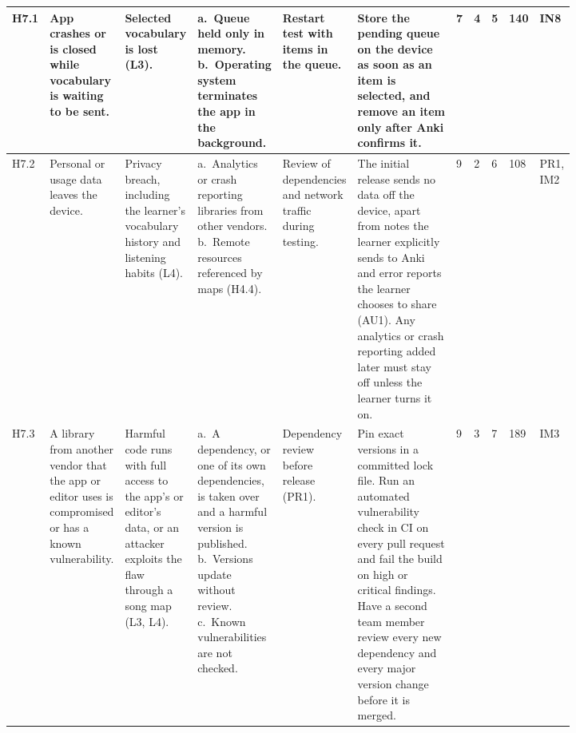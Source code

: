 \documentclass{article}
\begin{document}
\begin{landscape}
\begin{longtable}{P{0.04\linewidth}P{0.10\linewidth}P{0.12\linewidth}P{0.11\linewidth}P{0.10\linewidth}P{0.19\linewidth}P{0.022\linewidth}P{0.022\linewidth}P{0.022\linewidth}P{0.03\linewidth}P{0.06\linewidth}}
\midrule
H7.1 & App crashes or is closed while vocabulary is waiting to be sent. &
Selected vocabulary is lost (L3). &
a.~Queue held only in memory.\newline
b.~Operating system terminates the app in the background. &
Restart test with items in the queue. &
Store the pending queue on the device as soon as an item is selected, and
remove an item only after Anki confirms it. &
7 & 4 & 5 & 140 & IN8\\
\midrule
H7.2 & Personal or usage data leaves the device. &
Privacy breach, including the learner's vocabulary history and listening
habits (L4). &
a.~Analytics or crash reporting libraries from other vendors.\newline
b.~Remote resources referenced by maps (H4.4). &
Review of dependencies and network traffic during testing. &
The initial release sends no data off the device, apart from notes the learner
explicitly sends to Anki and error reports the learner chooses to share (AU1).
Any analytics or crash reporting added later must stay off unless the learner
turns it on. &
9 & 2 & 6 & 108 & PR1, IM2\\
\midrule
H7.3 & A library from another vendor that the app or editor uses is
compromised or has a known vulnerability. &
Harmful code runs with full access to the app's or editor's data, or an
attacker exploits the flaw through a song map (L3, L4). &
a.~A dependency, or one of its own dependencies, is taken over and a harmful
version is published.\newline
b.~Versions update without review.\newline
c.~Known vulnerabilities are not checked. &
Dependency review before release (PR1). &
Pin exact versions in a committed lock file. Run an automated vulnerability
check in CI on every pull request and fail the build on high or critical
findings. Have a second team member review every new dependency and every
major version change before it is merged. &
9 & 3 & 7 & 189 & IM3\\
\end{longtable}
\end{landscape}
\ClearShipoutPictureFG
\end{document}
